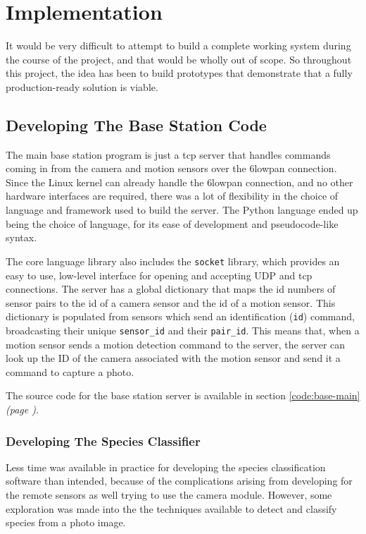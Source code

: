 \chapter{Implementation}

It would be very difficult to attempt to build a complete working system
during the course of the project, and that would be wholly out of scope. So
throughout this project, the idea has been to build prototypes that
demonstrate that a fully production-ready solution is viable.


\section{Developing The Base Station Code}
The main base station program is just a \acrshort{tcp} server that handles
commands coming in from the camera and motion sensors over the \gls{6lowpan}
connection. Since the Linux kernel can already handle the \gls{6lowpan}
connection, and no other hardware interfaces are required, there was a lot of
flexibility in the choice of language and framework used to build the server.
The Python language ended up being the choice of language, for its ease of
development and pseudocode-like syntax.

The core language library also includes the \texttt{socket} library, which
provides an easy to use, low-level interface for opening and accepting UDP
and \acrshort{tcp} connections. The server has a global dictionary that maps
the id numbers of sensor pairs to the id of a camera sensor and the id of a
motion sensor. This dictionary is populated from sensors which send an
identification (\texttt{id}) command, broadcasting their unique
\texttt{sensor\_id} and their \texttt{pair\_id}. This means that, when a
motion sensor sends a motion detection command to the server, the server can
look up the ID of the camera associated with the motion sensor and send it a
command to capture a photo.

The source code for the base station server is available in section
\ref{code:base-main} \textit{(page \pageref{code:base-main})}.

\subsection{Developing The Species Classifier}
Less time was available in practice for developing the species classification
software than intended, because of the complications arising from developing
for the remote sensors as well trying to use the camera module. However, some
exploration was made into the the techniques available to detect and classify
species from a photo image.

